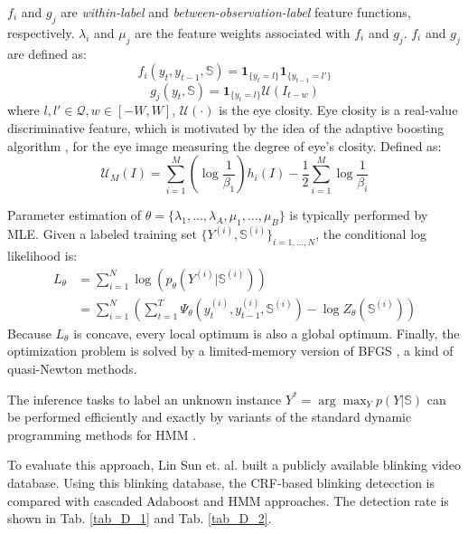 \documentclass[journal]{IEEEtran}
\begin{document}
$f_i$ and $g_j$ are \textit{within-label} and \textit{between-observation-label} feature functions, respectively. $\lambda_i$ and $\mu_j$ are the feature weights associated with $f_i$ and $g_j$. $f_i$ and $g_j$ are defined as:
\begin{equation}
\label{eq_D_4}
f_i(y_t,y_{t-1},\mathbb{S}) = \mathbf{1}_{\{y_t=l\}} \mathbf{1}_{\{y_{t-1}=l'\}}
\end{equation}
\begin{equation}
\label{eq_D_5}
g_j(y_t,\mathbb{S}) = \mathbf{1}_{\{y_t=l\}} \mathcal{U}(I_{t-w})
\end{equation}
where $l, l' \in \mathcal{Q}, w\in[-W,W]$, $\mathcal{U}(\cdot)$ is the eye closity. Eye closity is a real-value discriminative feature, which is motivated by the idea of the adaptive boosting algorithm \cite{freund1997decision}, for the eye image measuring the degree of eye's closity. Defined as:
\begin{equation}
\label{eq_D_6}
\mathcal{U}_M(I) = \sum_{i=1}^M (\log \frac{1}{\beta_1}) h_i(I) - \frac{1}{2} \sum_{i=1}^M \log \frac{1}{\beta_i}
\end{equation}

Parameter estimation of $\theta=\{\lambda_1,\dots,\lambda_A,\mu_1,\dots,\mu_B\}$ is typically performed by MLE. Given a labeled training set $\{Y^{(i)}, \mathbb{S}^{(i)}\}_{i=1,\dots,N}$, the conditional log likelihood is:
\begin{equation}
\label{eq_D_7}
\begin{aligned}
L_\theta &= \sum_{i=1}^N \log (p_\theta(Y^{(i)}|\mathbb{S}^{(i)})) \\
&= \sum_{i=1}^N (\sum_{t=1}^T \Psi_\theta(y_t^{(i)},y_{t-1}^{(i)},\mathbb{S}^{(i)}) - \log Z_\theta(\mathbb{S}^{(i)}))
\end{aligned}
\end{equation}
Because $L_\theta$ is concave, every local optimum is also a global optimum. Finally, the optimization problem is solved by a limited-memory version of BFGS \cite{sha2003shallow}, a kind of quasi-Newton methods.

The inference tasks to label an unknown instance $Y^* = \arg \max_Y p(Y|\mathbb{S})$ can be performed efficiently and exactly by variants of the standard dynamic programming methods for HMM \cite{rabiner1989tutorial}.

To evaluate this approach, Lin Sun et. al. \cite{pan2007eyeblink} built a publicly available blinking video database. Using this blinking database, the CRF-based blinking detecction is compared with cascaded Adaboost and HMM approaches. The detection rate is shown in Tab. \ref{tab_D_1} and Tab. \ref{tab_D_2}.
\end{document}
